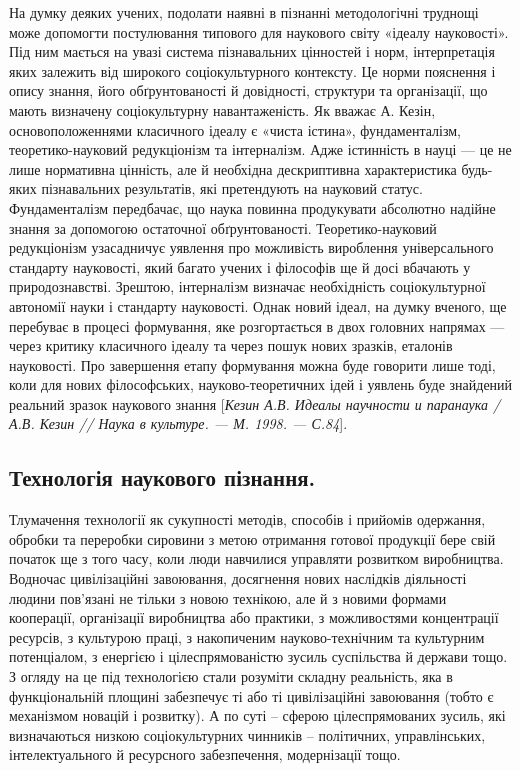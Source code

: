 На думку деяких учених, подолати наявні в пізнанні методологічні
труднощі може допомогти постулювання типового для наукового світу «ідеалу
науковості». Під ним мається на увазі система пізнавальних цінностей і норм,
інтерпретація яких залежить від широкого соціокультурного контексту. Це
норми пояснення і опису знання, його обґрунтованості й довідності, структури
та організації, що мають визначену соціокультурну навантаженість. Як вважає
А. Кезін, основоположеннями класичного ідеалу є «чиста істина»,
фундаменталізм, теоретико-науковий редукціонізм та інтерналізм. Адже
істинність в науці --- це не лише нормативна цінність, але й необхідна
дескриптивна характеристика будь-яких пізнавальних результатів, які
претендують на науковий статус. Фундаменталізм передбачає, що наука
повинна продукувати абсолютно надійне знання за допомогою остаточної
обґрунтованості. Теоретико-науковий редукціонізм узасадничує уявлення про
можливість вироблення універсального стандарту науковості, який багато
учених і філософів ще й досі вбачають у природознавстві. Зрештою,
інтерналізм визначає необхідність соціокультурної автономії науки і стандарту
науковості. Однак новий ідеал, на думку вченого, ще перебуває в процесі
формування, яке розгортається в двох головних напрямах --- через критику
класичного ідеалу та через пошук нових зразків, еталонів науковості. Про
завершення етапу формування можна буде говорити лише тоді, коли для нових
філософських, науково-теоретичних ідей і уявлень буде знайдений реальний
зразок наукового знання [\textit{Кезин А.В. Идеалы научности и паранаука / А.В.
Кезин // Наука в культуре. --- М. 1998. --- С.84}].

\subsection{Технологія наукового пізнання.} Тлумачення технології як сукупності
методів, способів і прийомів одержання, обробки та переробки сировини з
метою отримання готової продукції бере свій початок ще з того часу, коли
люди навчилися управляти розвитком виробництва. Водночас цивілізаційні
завоювання, досягнення нових наслідків діяльності людини пов’язані не тільки
з новою технікою, але й з новими формами кооперації, організації виробництва
або практики, з можливостями концентрації ресурсів, з культурою праці, з
накопиченим науково-технічним та культурним потенціалом, з енергією і
цілеспрямованістю зусиль суспільства й держави тощо. З огляду на це під
технологією стали розуміти складну реальність, яка в функціональній площині
забезпечує ті або ті цивілізаційні завоювання (тобто є механізмом новацій і
розвитку). А по суті – сферою цілеспрямованих зусиль, які визначаються
низкою соціокультурних чинників – політичних, управлінських,
інтелектуального й ресурсного забезпечення, модернізації тощо.

